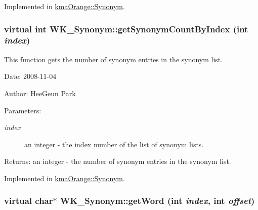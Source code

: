 Implemented in \hyperlink{classkmaOrange_1_1Synonym_0004ea3dc231d3740211d96d036ef976}{kmaOrange::Synonym}.\hypertarget{classWK__Synonym_3a50ddb83a62f2bf3fa3d4317ea42742}{
\subsubsection[{getSynonymCountByIndex}]{\setlength{\rightskip}{0pt plus 5cm}virtual int WK\_\-Synonym::getSynonymCountByIndex (int {\em index})}}
\label{classWK__Synonym_3a50ddb83a62f2bf3fa3d4317ea42742}


This function gets the number of synonym entries in the synonym list. 

\begin{Desc}
\item[Date:]2008-11-04 \end{Desc}
\begin{Desc}
\item[Author:]HeeGeun Park \end{Desc}
\begin{Desc}
\item[Parameters:]
\begin{description}
\item[{\em index}]an integer - the index number of the list of synonym lists. \end{description}
\end{Desc}
\begin{Desc}
\item[Returns:]an integer - the number of synonym entries in the synonym list. \end{Desc}


Implemented in \hyperlink{classkmaOrange_1_1Synonym_7d808654c78ba40bca5caa7d622e931d}{kmaOrange::Synonym}.\hypertarget{classWK__Synonym_f4d75e1d6a074196c04d8857802d9414}{
\subsubsection[{getWord}]{\setlength{\rightskip}{0pt plus 5cm}virtual char$\ast$ WK\_\-Synonym::getWord (int {\em index}, \/  int {\em offset})}}
\label{classWK__Synonym_f4d75e1d6a074196c04d8857802d9414}


